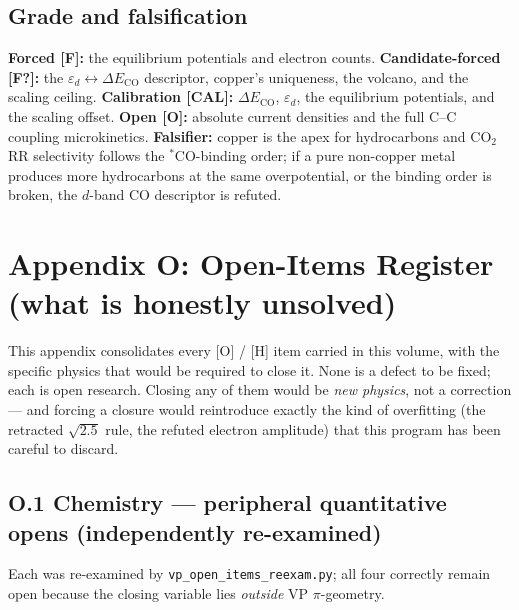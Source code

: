 \documentclass[
  10pt,
]{article}
\begin{document}
\hypertarget{grade-and-falsification}{%
\subsection{Grade and falsification}\label{grade-and-falsification}}

\textbf{Forced {[}F{]}:} the equilibrium potentials and electron counts.
\textbf{Candidate-forced {[}F?{]}:} the
\(\varepsilon_d \leftrightarrow \Delta E_{\mathrm{CO}}\) descriptor,
copper's uniqueness, the volcano, and the scaling ceiling.
\textbf{Calibration {[}CAL{]}:} \(\Delta E_{\mathrm{CO}}\),
\(\varepsilon_d\), the equilibrium potentials, and the scaling offset.
\textbf{Open {[}O{]}:} absolute current densities and the full C--C
coupling microkinetics. \textbf{Falsifier:} copper is the apex for
hydrocarbons and CO\(_2\)RR selectivity follows the \(^*\)CO-binding
order; if a pure non-copper metal produces more hydrocarbons at the same
overpotential, or the binding order is broken, the \(d\)-band CO
descriptor is refuted.

\newpage

\hypertarget{appendix-o-open-items-register-what-is-honestly-unsolved}{%
\section{Appendix O: Open-Items Register (what is honestly
unsolved)}\label{appendix-o-open-items-register-what-is-honestly-unsolved}}

This appendix consolidates every {[}O{]} / {[}H{]} item carried in this
volume, with the specific physics that would be required to close it.
None is a defect to be fixed; each is open research. Closing any of them
would be \emph{new physics}, not a correction --- and forcing a closure
would reintroduce exactly the kind of overfitting (the retracted
\(\sqrt{2.5}\) rule, the refuted electron amplitude) that this program
has been careful to discard.

\hypertarget{o.1-chemistry-peripheral-quantitative-opens-independently-re-examined}{%
\subsection{O.1 Chemistry --- peripheral quantitative opens
(independently
re-examined)}\label{o.1-chemistry-peripheral-quantitative-opens-independently-re-examined}}

Each was re-examined by \texttt{vp\_open\_items\_reexam.py}; all four
correctly remain open because the closing variable lies \emph{outside}
VP \(\pi\)-geometry.
\end{document}
